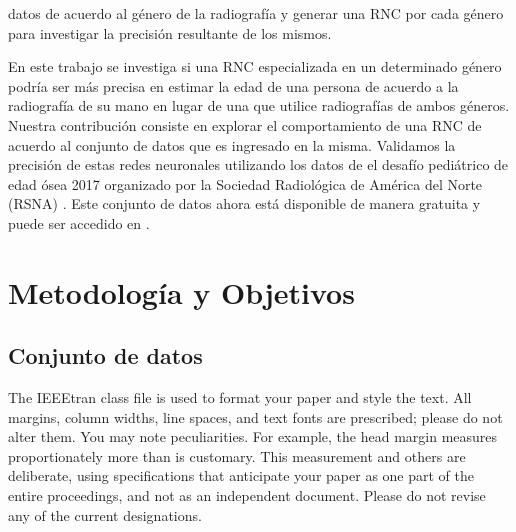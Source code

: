 \documentclass[conference]{IEEEtran}
\begin{document}
datos de acuerdo al género de la radiografía y generar una RNC por cada género para investigar la precisión resultante de los mismos. 

En este trabajo se investiga si una RNC especializada en un determinado género podría ser más precisa en estimar la edad de una persona de acuerdo a la radiografía de su mano en lugar de una que utilice radiografías de ambos géneros. Nuestra contribución consiste en explorar el comportamiento de una RNC de acuerdo al conjunto de datos que es ingresado en la misma. Validamos la precisión de estas redes neuronales utilizando los datos de el desafío pediátrico de edad ósea 2017 organizado por la Sociedad Radiológica de América del Norte (RSNA) \cite{RSNAChallenge}. Este conjunto de datos ahora está disponible de manera gratuita y puede ser accedido en \cite{RSNADataSet}.

\section{Metodología y Objetivos}

\subsection{Conjunto de datos}

The IEEEtran class file is used to format your paper and style the text. All margins, 
column widths, line spaces, and text fonts are prescribed; please do not 
alter them. You may note peculiarities. For example, the head margin
measures proportionately more than is customary. This measurement 
and others are deliberate, using specifications that anticipate your paper 
as one part of the entire proceedings, and not as an independent document. 
Please do not revise any of the current designations.

\end{document}
